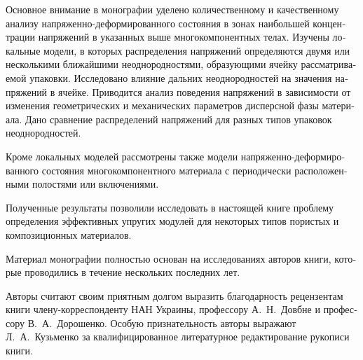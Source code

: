 \begin{russian}
Основное внимание в монографии уделено количественному и качественному анализу напряженно-деформированного состояния в зонах наибольшей концентрации напряжений в указанных выше многокомпонентных телах. Изучены локальные модели, в которых распределения напряжений определяются двумя или несколькими ближайшими неоднородностями, образующими ячейку рассматриваемой упаковки. Исследовано влияние дальних неоднородностей на значения напряжений в ячейке. Приводится анализ поведения напряжений в зависимости от изменения геометрических и механических параметров дисперсной фазы материала. Дано сравнение распределений напряжений для разных типов упаковок неоднородностей.

Кроме локальных моделей рассмотрены также модели напряженно-деформированного состояния многокомпонентного материала с периодически расположенными полостями или включениями.

Полученные результаты позволили исследовать в настоящей книге проблему определения эффективных упругих модулей для некоторых типов пористых и композиционных материалов.

Материал монографии полностью основан на исследованиях авторов книги, которые проводились в течение нескольких последних лет.

Авторы считают своим приятным долгом выразить благодарность рецензентам книги члену-корреспонденту НАН Украины, профессору А.~Н.~Довбне и профессору В.~А.~Дорошенко. Особую признательность авторы выражают Л.~А.~Кузьменко за квалифицированное литературное редактирование рукописи книги.


\end{russian}